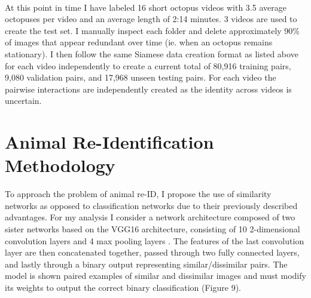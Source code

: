 \documentclass[11pt]{article}
\begin{document}
\newline
\\
At this point in time I have labeled 16 short octopus videos with 3.5 average octopuses per video and an average length of 2:14 minutes. 3 videos are used to create the test set. I manually inspect each folder and delete approximately 90\% of images that appear redundant over time (ie. when an octopus remains stationary). I then follow the same Siamese data creation format as listed above for each video independently to create a current total of 80,916 training pairs, 9,080 validation pairs, and 17,968 unseen testing pairs. For each video the pairwise interactions are independently created as the identity across videos is uncertain.

\section*{Animal Re-Identification Methodology}

To approach the problem of animal re-ID, I propose the use of similarity networks as opposed to classification networks due to their previously described advantages. For my analysis I consider a network architecture composed of two sister networks based on the VGG16 architecture, consisting of 10 2-dimensional convolution layers and 4 max pooling layers \cite{simonyan2014very}. The features of the last convolution layer are then concatenated together, passed through two fully connected layers, and lastly through a binary output representing similar/dissimilar pairs. The model is shown paired examples of similar and dissimilar images and must modify its weights to output the correct binary classification (Figure 9). 
\newline
\end{document}

